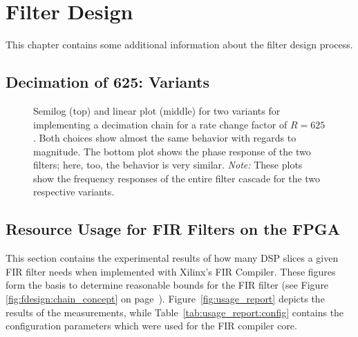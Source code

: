 \chapter{Filter Design} %
\label{ch:app:fdesign}

This  chapter contains  some additional  information about  the filter  design
process.

\section{Decimation of 625: Variants} %
\label{sec:dec625_variants}

\begin{figure}
    \centering
    
    \caption[Decimation Chain Variants for Rate of 625]{%
        Semilog  (top)  and   linear  plot  (middle)  for   two  variants  for
        implementing  a  decimation   chain  for  a  rate   change  factor  of
        $R=625$. Both choices  show almost the  same behavior with  regards to
        magnitude. The  bottom  plot  shows  the phase  response  of  the  two
        filters; here, too, the behavior  is very similar. \emph{Note:}  These
        plots show  the frequency responses  of the entire filter  cascade for
        the two respective variants.%
    }
    \label{fig:dec625_variants}
\end{figure}


\section{Resource Usage for FIR Filters on the FPGA} %
\label{sec:fir_filter_resouce_usage}

This   section   contains  the   experimental   results   of  how   many   DSP
slices  a  given   FIR  filter  needs  when  implemented   with  Xilinx's  FIR
Compiler. These  figures form  the basis  to determine  reasonable bounds  for
the  FIR  filter   (see  Figure~  \ref{fig:fdesign:chain_concept}
on    page~\pageref{fig:fdesign:chain_concept}). Figure~\ref{fig:usage_report}
depicts      the       results      of      the       measurements,      while
Table~\ref{tab:usage_report:config}  contains   the  configuration  parameters
which were used for the FIR compiler core.


